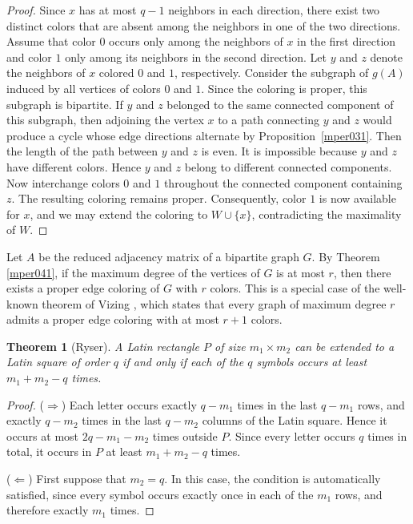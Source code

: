 \documentclass[11pt]{article}
\newtheorem{theorem}{Theorem}[section]
\theoremstyle{definition}
\begin{document}
{{{\begin{proof}
Since $x$ has at most $q-1$ neighbors in each direction, there exist two distinct colors that are absent among the neighbors in one of the two directions.
Assume that color $0$ occurs only among the neighbors of $x$ in the first direction and color $1$ only among its neighbors in the second direction. Let $y$ and $z$ denote the neighbors of $x$ colored $0$ and $1$, respectively. Consider the subgraph of $g(A)$ induced by all vertices of colors $0$ and $1$. Since the coloring is proper, this subgraph is bipartite. If $y$ and $z$ belonged to the same connected component of this subgraph, then adjoining the vertex $x$ to a path connecting $y$ and $z$ would produce a cycle whose edge directions alternate by Proposition~\ref{mper031}.   Then the length of the  path between $y$ and $z$ is even.  It is impossible because $y$ and $z$ have different colors. Hence $y$ and $z$ belong to different connected components. Now interchange colors $0$ and $1$ throughout the connected component containing $z$. The resulting coloring remains proper. Consequently, color $1$ is now available for $x$, and we may extend the coloring to $W\cup\{x\}$, contradicting the maximality of $W$. \end{proof}






Let $A$ be the  reduced adjacency matrix of a bipartite
graph $G$.  By  Theorem \ref{mper041}, if the maximum  degree of the vertices of $G$  is at most $r$, then there exists a proper edge coloring of $G$
 with $r$ colors. This is a special case of the well-known theorem
of Vizing \cite{Viz64}, which states that
every graph of maximum degree $r$ admits a proper edge coloring with at most $r+1$ colors.



\begin{theorem}[Ryser]
A Latin rectangle $P$ of size $m_1\times m_2$ can be extended to a
Latin square of order $q$ if and only if
each of the $q$  symbols occurs at least $m_1+m_2-q$
times.
\end{theorem}
\begin{proof}
($\Rightarrow$)  Each 
letter occurs exactly $q-m_1$ times in the last $q-m_1$ rows, and exactly  $q-m_2$
times in the last $q-m_2$ columns  of the Latin square. Hence it  occurs at most $2q-m_1-m_2$ times outside $P$. Since every letter  occurs $q$ times in total, it occurs in $P$ at  least $m_1+m_2-q$
times.


($\Leftarrow$) First suppose that $m_2=q$. In this case, the
condition 
is automatically satisfied, since every symbol
occurs exactly once in each of the $m_1$ rows, and therefore exactly $m_1$ times.


\end{proof}}}}
\end{document}
